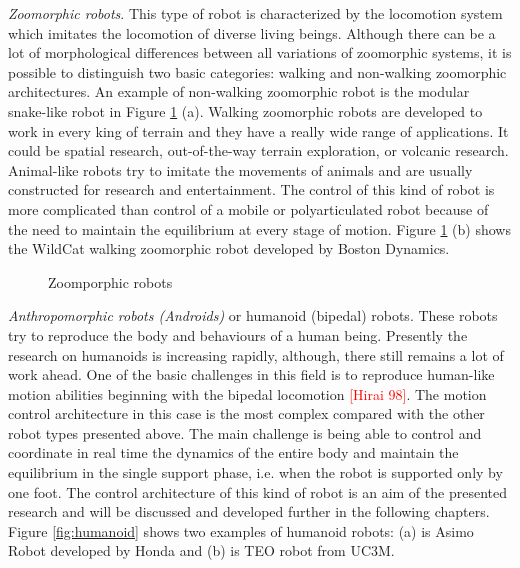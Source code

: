 \textit{Zoomorphic robots}. This type of robot is characterized by the locomotion system which imitates the locomotion of diverse living beings. Although there can be a lot of morphological differences between all variations of zoomorphic systems, it is possible to distinguish two basic categories: walking and non-walking zoomorphic architectures. An example of non-walking zoomorphic robot is the modular snake-like robot in Figure \ref{fig:zoo} (a). Walking zoomorphic robots are developed to work in every king of terrain and they have a really wide range of applications. It could be spatial research, out-of-the-way terrain exploration, or volcanic research. Animal-like robots try to imitate the movements of animals and are usually constructed for research and entertainment. The control of this kind of robot is more complicated than control of a mobile or polyarticulated robot because of the need to maintain the equilibrium at every stage of motion. Figure \ref{fig:zoo} (b) shows the WildCat walking zoomorphic robot developed by Boston Dynamics.

\begin{figure}[!hbt]
\centering 
{}\hspace{10mm}
\caption{Zoomporphic robots}
\label{fig:zoo}
\end{figure}

\textit{Anthropomorphic robots (Androids)} or humanoid (bipedal) robots. These robots try to reproduce the body and behaviours of a human being. Presently the research on humanoids is increasing rapidly, although, there still remains a lot of work ahead. One of the basic challenges in this field is to reproduce human-like motion abilities beginning with the bipedal locomotion \textcolor{red}{[Hirai 98]}. The motion control architecture in this case is the most complex compared with the other robot types presented above. The main challenge is being able to control and coordinate in real time the dynamics of the entire body and maintain the equilibrium in the single support phase, i.e. when the robot is supported only by one foot. The control architecture of this kind of robot is an aim of the presented research and will be discussed and developed further in the following chapters. Figure \ref{fig:humanoid} shows two examples of humanoid robots: (a) is Asimo Robot developed by Honda and (b) is TEO robot from UC3M.

